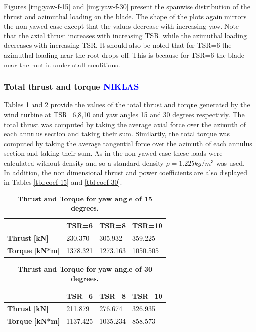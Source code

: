 Figures \ref{img:yaw-f-15} and \ref{img:yaw-f-30} present the spanwise distribution of the thrust and azimuthal loading on the blade. The shape of the plots again mirrors the non-yawed case except that the values decrease with increasing yaw. Note that the axial thrust increases with increasing TSR, while the azimuthal loading decreases with increasing TSR. It should also be noted that for TSR=6 the azimuthal loading near the root drops off. This is because for TSR=6 the blade near the root is under stall conditions.

\subsubsection{Total thrust and torque \textcolor{blue}{NIKLAS}}

Tables \ref{tbl:thrust-15} and \ref{tbl:thrust-30} provide the values of the total thrust and torque generated by the wind turbine at TSR=6,8,10 and yaw angles 15 and 30 degrees respectivly. The total thrust was computed by taking the average axial force over the azimuth of each annulus section and taking their sum. Similartly, the total torque was computed by taking the average tangential force over the azimuth of each annulus section and taking their sum. As in the non-yawed case these loads were calculated without density and so a standard density $\rho = 1.225 kg/m^3$ was used. In addition, the non dimensional thrust and power coefficients are also displayed in Tables \ref{tbl:coef-15} and \ref{tbl:coef-30}.
\begin{table}[h]
\begin{tabular}{|l|l|l|l|}
\hline
\caption{\textbf{Thrust and Torque for yaw angle of 15 degrees.}}
   & \textbf{TSR=6} & \textbf{TSR=8} & \textbf{TSR=10}  \\ \hline
\textbf{Thrust {[}kN{]}} &   230.370    &  305.932    &   359.225     \\ \hline
\textbf{Torque {[}kN*m{]}} &  1378.321   &  1273.163     &   1050.505     \\ \hline
\end{tabular}
\label{tbl:thrust-15}
\end{table}

\begin{table}[h]
\caption{\textbf{Thrust and Torque for yaw angle of 30 degrees.}}
\begin{tabular}{|l|l|l|l|}
\hline
   & \textbf{TSR=6} & \textbf{TSR=8} & \textbf{TSR=10}  \\ \hline
\textbf{Thrust {[}kN{]}} &   211.879    &  276.674     &   326.935     \\ \hline
\textbf{Torque {[}kN*m{]}} &   1137.425    &  1035.234     &   858.573     \\ \hline
\end{tabular}
\label{tbl:thrust-30}
\end{table}

